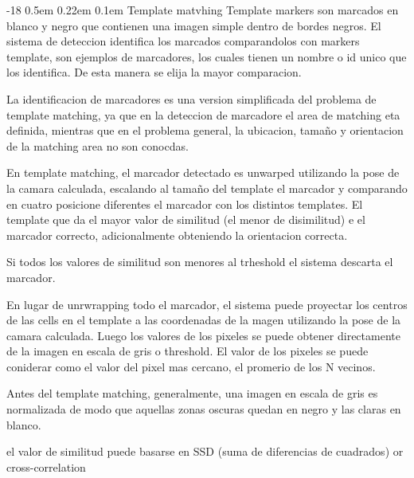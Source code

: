 \documentclass[runningheads]{llncs}
\makeatletter
\renewcommand\subsubsection{\@startsection{subsubsection}{3}{\z@}%
	{-18\p@ \@plus -4\p@ \@minus -4\p@}%
	{0.5em \@plus 0.22em \@minus 0.1em}%
	{\normalfont\normalsize\bfseries\boldmath}}
\makeatother
\begin{document}
\subsubsection{Template matvhing}
Template markers son marcados en blanco y negro que contienen una imagen simple dentro de bordes negros. El sistema de deteccion identifica los marcados comparandolos con markers template, son ejemplos de marcadores, los cuales tienen un nombre o id unico que los identifica. De esta manera se elija la mayor comparacion.

La identificacion de marcadores es una version simplificada del problema de template matching, ya que en la deteccion de marcadore el area de matching eta definida, mientras que en el problema general, la ubicacion, tamaño y orientacion de la matching area no son conocdas.

En template matching, el marcador detectado es unwarped utilizando la pose de la camara calculada, escalando al tamaño del template el marcador y comparando en cuatro posicione diferentes el marcador con los distintos templates. El template que da el mayor valor de similitud (el menor de disimilitud) e el marcador correcto, adicionalmente obteniendo la orientacion correcta.

Si todos los valores de similitud son menores al trheshold el sistema descarta el marcador.

En lugar de unrwrapping todo el marcador, el sistema puede proyectar los centros de las cells en el template a las coordenadas de la magen utilizando la pose de la camara calculada. Luego los valores de los pixeles se puede obtener directamente de la imagen en escala de gris o threshold. El valor de los pixeles se puede coniderar como el valor del pixel mas cercano, el promerio de los N vecinos.


Antes del template matching, generalmente, una imagen en escala de gris es normalizada de modo que aquellas zonas oscuras quedan en negro y las claras en blanco.

el valor de similitud puede basarse en SSD (suma de diferencias de cuadrados) or cross-correlation


{}

\end{document}
